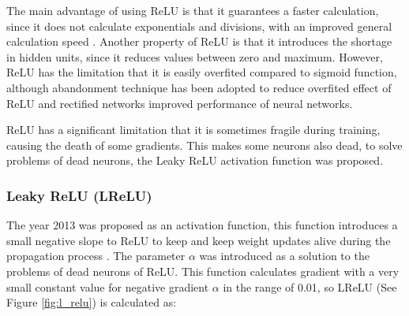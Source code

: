 \vspace{5mm} %

The main advantage of using ReLU is that it guarantees a faster calculation, since it does not calculate exponentials and divisions, with an improved general calculation speed \cite{Reference45}. Another property of ReLU is that it introduces the shortage in hidden units, since it reduces values between zero and maximum. However, ReLU has the limitation that it is easily overfited compared to sigmoid function, although abandonment technique has been adopted to reduce overfited effect of ReLU and rectified networks improved performance of neural networks.

\vspace{5mm} %

ReLU has a significant limitation that it is sometimes fragile during training, causing the death of some gradients. This makes some neurons also dead, to solve problems of dead neurons, the Leaky ReLU activation function was proposed.

\subsubsection{Leaky ReLU (LReLU)}

The year 2013 was proposed as an activation function, this function introduces a small negative slope to ReLU to keep and keep weight updates alive during the propagation process \cite{Reference44}. The parameter $\alpha$ was introduced as a solution to the problems of dead neurons of ReLU. This function calculates gradient with a very small constant value for negative gradient $\alpha$ in the range of 0.01, so LReLU (See Figure \ref{fig:l_relu}) is calculated as:

